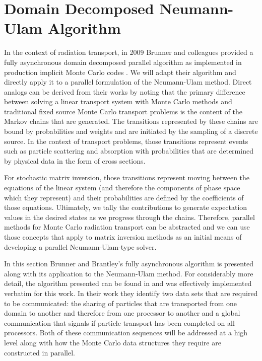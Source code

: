 \clearpage

\section{Domain Decomposed Neumann-Ulam Algorithm\ }
\label{sec:asynchronous_algorithm}
In the context of radiation transport, in 2009 Brunner and colleagues
provided a fully asynchronous domain decomposed parallel algorithm as
implemented in production implicit Monte Carlo codes
\citep{brunner_efficient_2009}. We will adapt their algorithm and
directly apply it to a parallel formulation of the Neumann-Ulam
method. Direct analogs can be derived from their works by noting that
the primary difference between solving a linear transport system with
Monte Carlo methods and traditional fixed source Monte Carlo transport
problems is the content of the Markov chains that are generated. The
transitions represented by these chains are bound by probabilities and
weights and are initiated by the sampling of a discrete source. In the
context of transport problems, those transitions represent events such
as particle scattering and absorption with probabilities that are
determined by physical data in the form of cross sections.

For stochastic matrix inversion, those transitions represent moving
between the equations of the linear system (and therefore the
components of phase space which they represent) and their
probabilities are defined by the coefficients of those
equations. Ultimately, we tally the contributions to generate
expectation values in the desired states as we progress through the
chains. Therefore, parallel methods for Monte Carlo radiation
transport can be abstracted and we can use those concepts that apply
to matrix inversion methods as an initial means of developing a
parallel Neumann-Ulam-type solver. 

In this section Brunner and Brantley's fully asynchronous algorithm is
presented along with its application to the Neumann-Ulam method. For
considerably more detail, the algorithm presented can be found in
\citep{brunner_efficient_2009} and was effectively implemented
verbatim for this work. In their work they identify two data sets that
are required to be communicated: the sharing of particles that are
transported from one domain to another and therefore from one
processor to another and a global communication that signals if
particle transport has been completed on all processors. Both of these
communication sequences will be addressed at a high level along with
how the Monte Carlo data structures they require are constructed in
parallel.

